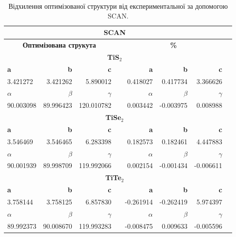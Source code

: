 \begin{table}[!htp]\centering
\scriptsize
\begin{tabular}{lrrrrrrr}\toprule
\multicolumn{7}{c}{\textbf{SCAN}} \\\midrule
\multicolumn{3}{c}{\textbf{Оптимізована струкута}} & &\multicolumn{3}{c}{\textbf{\%}} \\
\multicolumn{7}{c}{\textbf{TiS$_2$}} \\
\textbf{a} &\textbf{b} &\textbf{c} & &\textbf{a} &\textbf{b} &\textbf{c} \\
3.421272 &3.421262 &5.890012 & &0.418027 &0.417734 &3.366626 \\
\textbf{$\alpha$} &\textbf{$\beta$} &\textbf{$\gamma$} & &\textbf{$\alpha$} &\textbf{$\beta$} &\textbf{$\gamma$} \\
90.003098 &89.996423 &120.010782 & &0.003442 &-0.003975 &0.008988 \\
\multicolumn{7}{c}{\textbf{TiSe$_2$}} \\
\textbf{a} &\textbf{b} &\textbf{c} & &\textbf{a} &\textbf{b} &\textbf{c} \\
3.546469 &3.546465 &6.283398 & &0.182573 &0.182461 &4.447883 \\
\textbf{$\alpha$} &\textbf{$\beta$} &\textbf{$\gamma$} & &\textbf{$\alpha$} &\textbf{$\beta$} &\textbf{$\gamma$} \\
90.001939 &89.998709 &119.992066 & &0.002154 &-0.001434 &-0.006611 \\
\multicolumn{7}{c}{\textbf{TiTe$_2$}} \\
\textbf{a} &\textbf{b} &\textbf{c} & &\textbf{a} &\textbf{b} &\textbf{c} \\
3.758144 &3.758125 &6.857830 & &-0.261914 &-0.262419 &5.974397 \\
\textbf{$\alpha$} &\textbf{$\beta$} &\textbf{$\gamma$} & &\textbf{$\alpha$} &\textbf{$\beta$} &\textbf{$\gamma$} \\
89.992373 &90.008670 &119.993283 & &-0.008475 &0.009633 &-0.005596 \\
\bottomrule
\end{tabular}
\caption{Відхилення оптимізованої структури від експериментальної за допомогою SCAN.}\label{tab:SCANlat}
\end{table}

